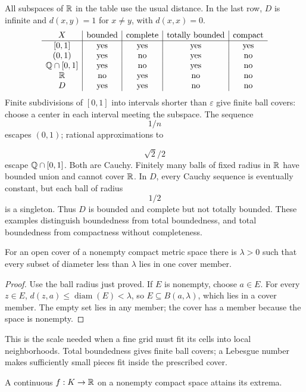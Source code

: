 \begin{example}
All subspaces of $\mathbb{R}$ in the table use the usual distance. In the last row,
$D$ is infinite and $d(x,y)=1$ for $x\ne y$, with $d(x,x)=0$.
\[
\begin{array}{c|c|c|c|c}
X&\text{bounded}&\text{complete}&\text{totally bounded}&\text{compact}\\\hline
[0,1]&\text{yes}&\text{yes}&\text{yes}&\text{yes}\\
(0,1)&\text{yes}&\text{no}&\text{yes}&\text{no}\\
\mathbb{Q}\cap[0,1]&\text{yes}&\text{no}&\text{yes}&\text{no}\\
\mathbb{R}&\text{no}&\text{yes}&\text{no}&\text{no}\\
D&\text{yes}&\text{yes}&\text{no}&\text{no}
\end{array}
\]
Finite subdivisions of $[0,1]$ into intervals shorter than $\varepsilon$
give finite ball covers: choose a center in each interval meeting the
subspace. The sequence
\[
1/n
\]
 escapes $(0,1)$; rational approximations to

\[
\sqrt2/2
\]
 escape $\mathbb{Q}\cap[0,1]$. Both are Cauchy. Finitely many balls of
fixed radius in $\mathbb{R}$ have bounded union and cannot cover $\mathbb{R}$.
In $D$, every Cauchy sequence is eventually constant, but each ball of
radius
\[
1/2
\]
 is a singleton. Thus $D$ is bounded and complete but not
totally bounded. These examples distinguish boundedness from total
boundedness, and total boundedness from compactness without completeness.
\end{example}
\begin{lemma}\label{lem:compact-metric-lebesgue-number}
For an open cover of a nonempty compact metric space there is $\lambda>0$
such that every subset of diameter less than $\lambda$ lies in one cover member.
\end{lemma}
\begin{proof}
Use the ball radius just proved. If $E$ is nonempty, choose $a\in E$.
For every $z\in E$, $d(z,a)\leq\operatorname{diam}(E)<\lambda$, so
$E\subseteq B(a,\lambda)$, which lies in a cover member. The empty set
lies in any member; the cover has a member because the space is nonempty.
\end{proof}

This is the scale needed when a fine grid must fit its cells into local
neighborhoods. Total boundedness gives finite ball covers; a Lebesgue number makes
sufficiently small pieces fit inside the prescribed cover.
\begin{theorem}\label{thm:compact-extreme-value}
A continuous $f:K\to\mathbb{R}$ on a nonempty compact space attains its extrema.
\end{theorem}
